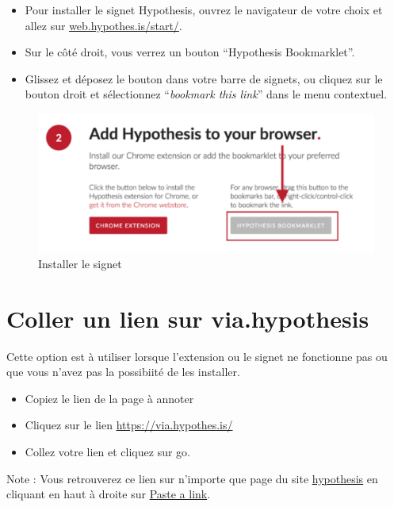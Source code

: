 \documentclass[
]{book}
\providecommand{\tightlist}{%
  \setlength{\itemsep}{0pt}\setlength{\parskip}{0pt}}
\begin{document}
\begin{itemize}
\tightlist
\item
  Pour installer le signet Hypothesis, ouvrez le navigateur de votre choix et allez sur \href{https://web.hypothes.is/start/}{web.hypothes.is/start/}.
\item
  Sur le côté droit, vous verrez un bouton ``Hypothesis Bookmarklet''.
\item
  Glissez et déposez le bouton dans votre barre de signets, ou cliquez sur le bouton droit et sélectionnez ``\emph{bookmark this link}'' dans le menu contextuel.
\end{itemize}

\begin{figure}
\centering
\includegraphics{img/10bf5d0ce6574ed9cbaa1f7df259038a.png}
\caption{Installer le signet}
\end{figure}

\hypertarget{s23}{%
\section{Coller un lien sur via.hypothesis}\label{s23}}

Cette option est à utiliser lorsque l'extension ou le signet ne fonctionne pas ou que vous n'avez pas la possibiité de les installer.

\begin{itemize}
\tightlist
\item
  Copiez le lien de la page à annoter
\item
  Cliquez sur le lien \url{https://via.hypothes.is/}
\item
  Collez votre lien et cliquez sur go.
\end{itemize}

Note : Vous retrouverez ce lien sur n'importe que page du site \href{https://web.hypothes.is/}{hypothesis} en cliquant en haut à droite sur \href{https://via.hypothes.is/}{Paste a link}.
\end{document}
